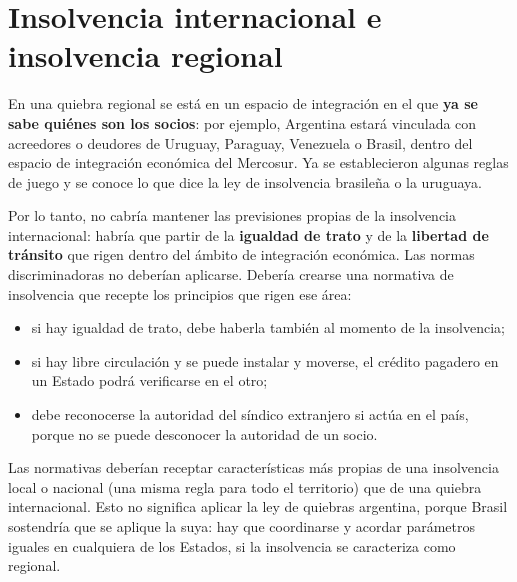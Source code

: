 \documentclass[12pt,oneside]{book}
\begin{document}
\section{Insolvencia internacional e insolvencia regional}

En una quiebra regional se está en un espacio de integración en el que \textbf{ya se sabe quiénes son los socios}: por ejemplo, Argentina estará vinculada con acreedores o deudores de Uruguay, Paraguay, Venezuela o Brasil, dentro del espacio de integración económica del Mercosur. Ya se establecieron algunas reglas de juego y se conoce lo que dice la ley de insolvencia brasileña o la uruguaya.

Por lo tanto, no cabría mantener las previsiones propias de la insolvencia internacional: habría que partir de la \textbf{igualdad de trato} y de la \textbf{libertad de tránsito} que rigen dentro del ámbito de integración económica. Las normas discriminadoras no deberían aplicarse. Debería crearse una normativa de insolvencia que recepte los principios que rigen ese área:

\begin{itemize}
    \item si hay igualdad de trato, debe haberla también al momento de la insolvencia;
    \item si hay libre circulación y se puede instalar y moverse, el crédito pagadero en un Estado podrá verificarse en el otro;
    \item debe reconocerse la autoridad del síndico extranjero si actúa en el país, porque no se puede desconocer la autoridad de un socio.
\end{itemize}

Las normativas deberían receptar características más propias de una insolvencia local o nacional (una misma regla para todo el territorio) que de una quiebra internacional. Esto no significa aplicar la ley de quiebras argentina, porque Brasil sostendría que se aplique la suya: hay que coordinarse y acordar parámetros iguales en cualquiera de los Estados, si la insolvencia se caracteriza como regional.
\end{document}
